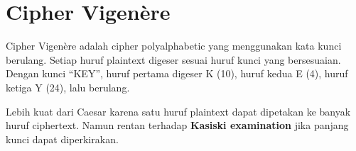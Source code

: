 \section{Cipher Vigenère}

Cipher Vigenère adalah cipher polyalphabetic yang menggunakan kata kunci berulang. Setiap huruf plaintext digeser sesuai huruf kunci yang bersesuaian. Dengan kunci ``KEY'', huruf pertama digeser K (10), huruf kedua E (4), huruf ketiga Y (24), lalu berulang.

Lebih kuat dari Caesar karena satu huruf plaintext dapat dipetakan ke banyak huruf ciphertext. Namun rentan terhadap \textbf{Kasiski examination} jika panjang kunci dapat diperkirakan.
